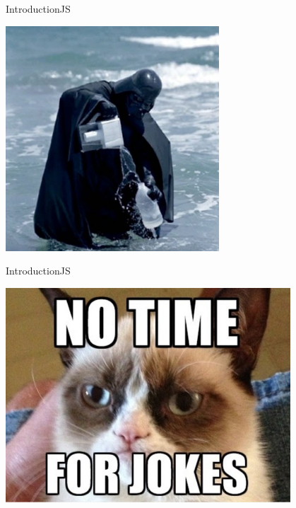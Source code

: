 \documentclass[10pt]{beamer}
\begin{document}
\begin{frame}{Introduction}{JS}
\begin{center}
	\includegraphics[width=0.6\textwidth]{pictures/wat1.jpg}
\end{center}
\end{frame}

\begin{frame}{Introduction}{JS}
\begin{center}
	\includegraphics[width=0.8\textwidth]{pictures/no_jokes.jpg}
\end{center}
\end{frame}

\end{document}

